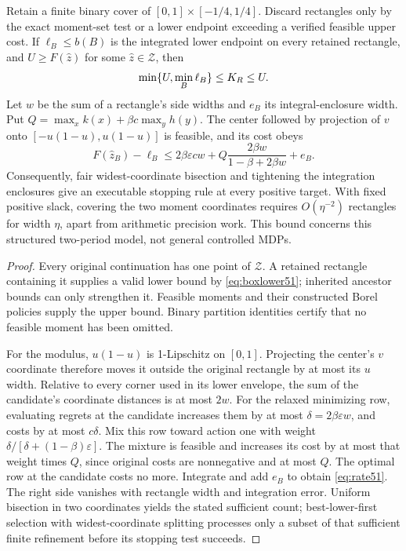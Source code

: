 \begin{proposition}\label{prop:cover51}
Retain a finite binary cover of $[0,1]\times[-1/4,1/4]$. Discard rectangles only by the exact moment-set test or a lower endpoint exceeding a verified feasible upper cost. If $\ell_B\le b(B)$ is the integrated lower endpoint on every retained rectangle, and $U\ge F(\widehat z)$ for some $\widehat z\in\mathcal Z$, then
\[
 \min\{U,\min_B\ell_B\}\le K_R\le U.
\]
Let $w$ be the sum of a rectangle's side widths and $e_B$ its integral-enclosure width. Put $Q=\max_x k(x)+\beta c\max_y h(y)$. The center followed by projection of $v$ onto $[-u(1-u),u(1-u)]$ is feasible, and its cost obeys
\begin{equation}\label{eq:rate51}
 F(\widehat z_B)-\ell_B
 \le 2\beta\varepsilon c w+
 Q\frac{2\beta w}{1-\beta+2\beta w}+e_B.
\end{equation}
Consequently, fair widest-coordinate bisection and tightening the integration enclosures give an executable stopping rule at every positive target. With fixed positive slack, covering the two moment coordinates requires $O(\eta^{-2})$ rectangles for width $\eta$, apart from arithmetic precision work. This bound concerns this structured two-period model, not general controlled MDPs.
\end{proposition}
\begin{proof}
Every original continuation has one point of $\mathcal Z$. A retained rectangle containing it supplies a valid lower bound by \eqref{eq:boxlower51}; inherited ancestor bounds can only strengthen it. Feasible moments and their constructed Borel policies supply the upper bound. Binary partition identities certify that no feasible moment has been omitted.

For the modulus, $u(1-u)$ is 1-Lipschitz on $[0,1]$. Projecting the center's $v$ coordinate therefore moves it outside the original rectangle by at most its $u$ width. Relative to every corner used in its lower envelope, the sum of the candidate's coordinate distances is at most $2w$. For the relaxed minimizing row, evaluating regrets at the candidate increases them by at most $\delta=2\beta\varepsilon w$, and costs by at most $c\delta$. Mix this row toward action one with weight $\delta/[\delta+(1-\beta)\varepsilon]$. The mixture is feasible and increases its cost by at most that weight times $Q$, since original costs are nonnegative and at most $Q$. The optimal row at the candidate costs no more. Integrate and add $e_B$ to obtain \eqref{eq:rate51}. The right side vanishes with rectangle width and integration error. Uniform bisection in two coordinates yields the stated sufficient count; best-lower-first selection with widest-coordinate splitting processes only a subset of that sufficient finite refinement before its stopping test succeeds.
\end{proof}

